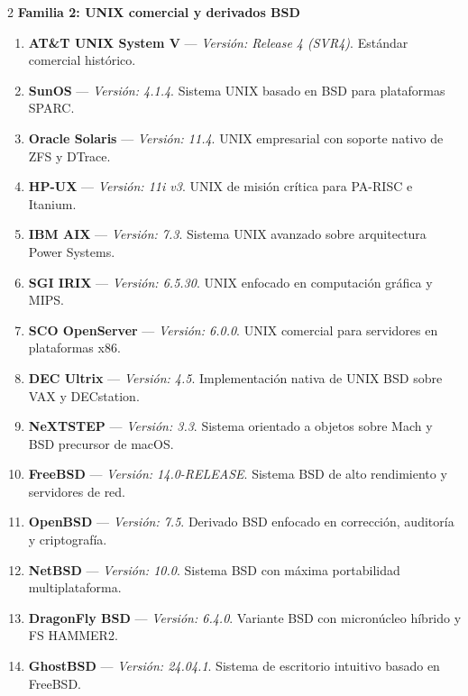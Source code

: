 \documentclass[12pt]{article}
\begin{document}
\begin{multicols}{2}
\medskip
\noindent\textbf{Familia 2: UNIX comercial y derivados BSD}\par\smallskip
\begin{enumerate}[label=\textbf{\arabic*.}, leftmargin=*, noitemsep, topsep=1pt, start=13]
    \item \textbf{AT\&T UNIX System V} --- \textit{Versión: Release 4 (SVR4)}. Estándar comercial histórico.
    \item \textbf{SunOS} --- \textit{Versión: 4.1.4}. Sistema UNIX basado en BSD para plataformas SPARC.
    \item \textbf{Oracle Solaris} --- \textit{Versión: 11.4}. UNIX empresarial con soporte nativo de ZFS y DTrace.
    \item \textbf{HP-UX} --- \textit{Versión: 11i v3}. UNIX de misión crítica para PA-RISC e Itanium.
    \item \textbf{IBM AIX} --- \textit{Versión: 7.3}. Sistema UNIX avanzado sobre arquitectura Power Systems.
    \item \textbf{SGI IRIX} --- \textit{Versión: 6.5.30}. UNIX enfocado en computación gráfica y MIPS.
    \item \textbf{SCO OpenServer} --- \textit{Versión: 6.0.0}. UNIX comercial para servidores en plataformas x86.
    \item \textbf{DEC Ultrix} --- \textit{Versión: 4.5}. Implementación nativa de UNIX BSD sobre VAX y DECstation.
    \item \textbf{NeXTSTEP} --- \textit{Versión: 3.3}. Sistema orientado a objetos sobre Mach y BSD precursor de macOS.
    \item \textbf{FreeBSD} --- \textit{Versión: 14.0-RELEASE}. Sistema BSD de alto rendimiento y servidores de red.
    \item \textbf{OpenBSD} --- \textit{Versión: 7.5}. Derivado BSD enfocado en corrección, auditoría y criptografía.
    \item \textbf{NetBSD} --- \textit{Versión: 10.0}. Sistema BSD con máxima portabilidad multiplataforma.
    \item \textbf{DragonFly BSD} --- \textit{Versión: 6.4.0}. Variante BSD con micronúcleo híbrido y FS HAMMER2.
    \item \textbf{GhostBSD} --- \textit{Versión: 24.04.1}. Sistema de escritorio intuitivo basado en FreeBSD.
\end{enumerate}


\end{multicols}
\end{document}
